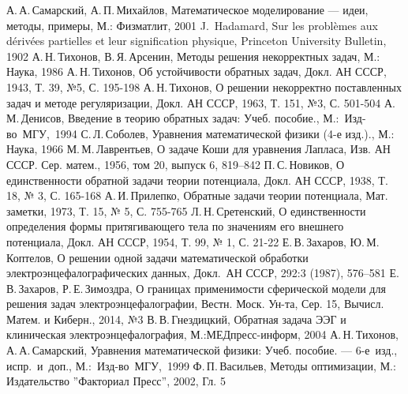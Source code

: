 \documentclass[oneside,final,12pt]{article}
\theoremstyle{definition}
\begin{document}
	\newpage
	\begin{thebibliography}{99}
        А.\,А.\,Самарский, А.\,П.\,Михайлов, Математическое моделирование --- идеи, методы, примеры, М.: Физматлит, 2001
        J.\, Hadamard, Sur les problèmes aux dérivées partielles et leur signification physique, Princeton University Bulletin, 1902
        А.\,Н.\,Тихонов, В.\,Я.\,Арсенин, Методы решения некорректных задач, М.: Наука, 1986
        А.\,Н.\,Тихонов, Об устойчивости обратных задач, Докл. АН СССР, 1943, Т. 39, №5, С. 195-198
        А.\,Н.\,Тихонов, О решении некорректно поставленных задач и методе регуляризации, Докл. АН СССР, 1963, Т. 151, №3, С. 501-504
        А.\,М.\,Денисов, Введение в теорию обратных задач: Учеб. пособие., М.:~Изд-во~МГУ,~1994
        С.\,Л.\,Соболев, Уравнения математической физики (4-е изд.)., М.: Наука, 1966
        М.\,М.\,Лаврентьев, О задаче Коши для уравнения Лапласа, Изв. АН СССР. Сер. матем., 1956, том 20, выпуск 6, 819–842
        П.\,С.\,Новиков, О единственности обратной задачи теории потенциала, Докл. АН СССР, 1938, Т. 18, № 3, С. 165-168
        А.\,И.\,Прилепко, Обратные задачи теории потенциала, Мат. заметки, 1973, Т. 15, № 5, С. 755-765
        Л.\,Н.\,Сретенский, О единственности определения формы притягивающего тела по значениям его внешнего потенциала, Докл. АН СССР, 1954, Т. 99, № 1, С. 21-22
        Е.\,В.\,Захаров, Ю.\,М.\,Коптелов, О решении одной задачи математической обработки электроэнцефалографических данных, Докл.~АН СССР, 292:3 (1987), 576–581
        Е.\,В.\,Захаров, Р.\,Е.\,Зимоздра, О границах применимости сферической модели для решения задач электроэнцефалографии, Вестн. Моск. Ун-та, Сер. 15, Вычисл. Матем. и Киберн., 2014, №3
        В.\,В.\,Гнездицкий, Обратная задача ЭЭГ и клиническая электроэнцефалография, М.:МЕДпресс-информ, 2004
		А.\,Н.\,Тихонов, А.\,А.\,Самарский, Уравнения математической физики: Учеб. пособие. --- 6-е~изд., испр.~и~доп., М.:~Изд-во~МГУ,~1999
        Ф.\,П.\,Васильев, Методы оптимизации, М.: Издательство ''Факториал Пресс'', 2002, Гл. 5
	\end{thebibliography}
\end{document}
